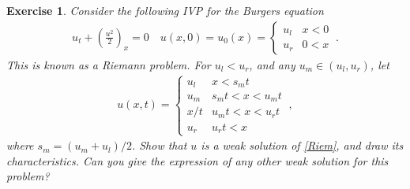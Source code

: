 \documentclass[10pt,letterpaper]{article}
\newcommand{\rb}[1]{ \left(  {#1} \right) }
\theoremstyle{break}
\newtheorem{exercise}{Exercise}
\begin{document}
\begin{exercise}
	Consider the following IVP for the Burgers equation
	\begin{gather} \label{Riem}
		u_t+\rb{\frac{u^2}{2}}_x=0
		\quad
		u(x,0)=u_0(x)=\begin{cases}
				u_l & x<0\\
				u_r & 0<x
			\end{cases}\ .
	\end{gather}%
	This is known as a \emph{Riemann problem}. 
	For $u_l<u_r$, and any $u_m\in\rb{u_l,u_r}$, let
	\begin{gather}%
		u(x,t)=\begin{cases}
				u_l & x<s_mt\\
				u_m & s_mt<x<u_mt\\
				x/t & u_mt<x<u_rt\\
				u_r & u_rt<x
			\end{cases}\ ,
	\end{gather}%
	where $s_m=(u_m+u_l)/2$.
	Show that $u$ is a weak solution of \eqref{Riem}, and draw its characteristics.
	Can you give the expression of any other weak solution for this problem?
\end{exercise}
\end{document}
